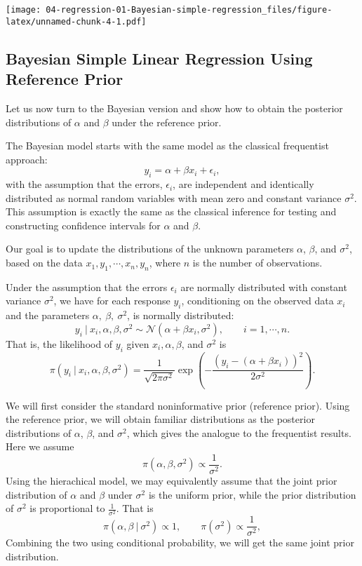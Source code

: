 \documentclass[]{book}
\theoremstyle{definition}
\theoremstyle{definition}
\theoremstyle{definition}
\theoremstyle{remark}
\begin{document}
\texttt{[image: 04-regression-01-Bayesian-simple-regression\_files/figure-latex/unnamed-chunk-4-1.pdf]}

\subsection{Bayesian Simple Linear Regression Using Reference
Prior}\label{bayesian-simple-linear-regression-using-reference-prior}

Let us now turn to the Bayesian version and show how to obtain the
posterior distributions of \(\alpha\) and \(\beta\) under the reference
prior.

The Bayesian model starts with the same model as the classical
frequentist approach: \[ y_i = \alpha + \beta x_i + \epsilon_i, \] with
the assumption that the errors, \(\epsilon_i\), are independent and
identically distributed as normal random variables with mean zero and
constant variance \(\sigma^2\). This assumption is exactly the same as
the classical inference for testing and constructing confidence
intervals for \(\alpha\) and \(\beta\).

Our goal is to update the distributions of the unknown parameters
\(\alpha\), \(\beta\), and \(\sigma^2\), based on the data
\(x_1, y_1, \cdots, x_n, y_n\), where \(n\) is the number of
observations.

Under the assumption that the errors \(\epsilon_i\) are normally
distributed with constant variance \(\sigma^2\), we have for each
response \(y_i\), conditioning on the observed data \(x_i\) and the
parameters \(\alpha,\ \beta,\ \sigma^2\), is normally distributed:
\[ y_i~|~x_i, \alpha, \beta,\sigma^2 \sim \mathcal{N}(\alpha + \beta x_i, \sigma^2),\qquad i = 1,\cdots, n. \]
That is, the likelihood of \(y_i\) given \(x_i, \alpha, \beta\), and
\(\sigma^2\) is
\[ \pi(y_i~|~x_i, \alpha, \beta, \sigma^2) = \frac{1}{\sqrt{2\pi\sigma^2}}\exp\left(-\frac{(y_i-(\alpha+\beta  x_i))^2}{2\sigma^2}\right). \]

We will first consider the standard noninformative prior (reference
prior). Using the reference prior, we will obtain familiar distributions
as the posterior distributions of \(\alpha\), \(\beta\), and
\(\sigma^2\), which gives the analogue to the frequentist results. Here
we assume \[ \pi(\alpha, \beta, \sigma^2)\propto \frac{1}{\sigma^2}. \]
Using the hierachical model, we may equivalently assume that the joint
prior distribution of \(\alpha\) and \(\beta\) under \(\sigma^2\) is the
uniform prior, while the prior distribution of \(\sigma^2\) is
proportional to \(\displaystyle \frac{1}{\sigma^2}\). That is
\[ \pi(\alpha, \beta~|~\sigma^2) \propto 1, \qquad \pi(\sigma^2) \propto \frac{1}{\sigma^2}, \]
Combining the two using conditional probability, we will get the same
joint prior distribution.
\end{document}
